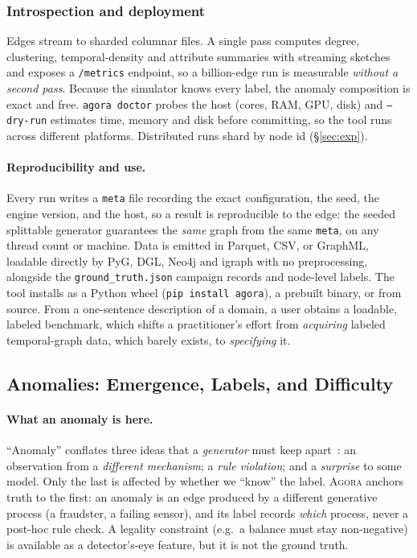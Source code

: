 \documentclass[sigconf,review,anonymous]{acmart}
\newcommand{\sys}{\textsc{Agora}\xspace}
\begin{document}
\subsubsection{Introspection and deployment}
Edges stream to sharded columnar files. A single pass computes degree, clustering,
temporal-density and attribute summaries with streaming
sketches~\cite{flajolet2007hyperloglog,cormode2005countmin} and exposes a
\texttt{/metrics} endpoint, so a billion-edge run is measurable \emph{without a second
pass}. Because the simulator knows every label, the anomaly composition is exact and
free. \texttt{agora doctor} probes the host (cores, RAM, GPU, disk) and
\texttt{--dry-run} estimates time, memory and disk before committing, so the tool runs
across different platforms. Distributed runs shard by node id (\S\ref{sec:exp}).

\paragraph{Reproducibility and use.}
Every run writes a \texttt{meta} file recording the exact configuration, the seed, the
engine version, and the host, so a result is reproducible to the edge: the seeded
splittable generator guarantees the \emph{same} graph from the same \texttt{meta}, on
any thread count or machine. Data is emitted in Parquet, CSV, or GraphML, loadable
directly by PyG, DGL, Neo4j and igraph with no preprocessing, alongside the
\texttt{ground\_truth.json} campaign records and node-level labels. The tool installs
as a Python wheel (\texttt{pip install agora}), a prebuilt binary, or from source. From
a one-sentence description of a domain, a user obtains a loadable, labeled benchmark,
which shifts a practitioner's effort from \emph{acquiring} labeled temporal-graph data,
which barely exists, to \emph{specifying} it.

\subsection{Anomalies: Emergence, Labels, and Difficulty}
\label{sec:anom}
\paragraph{What an anomaly is here.}
``Anomaly'' conflates three ideas that a \emph{generator} must keep
apart~\cite{hawkins1980identification,chandola2009anomaly}: an observation from a
\emph{different mechanism}; a \emph{rule violation}; and a \emph{surprise} to some
model. Only the last is affected by whether we ``know'' the label. \sys{} anchors
truth to the first: an anomaly is an edge produced by a different generative
process (a fraudster, a failing sensor), and its label records \emph{which}
process, never a post-hoc rule check. A legality constraint (e.g.\ a balance must
stay non-negative) is available as a detector's-eye feature, but it is not the
ground truth.
\end{document}

